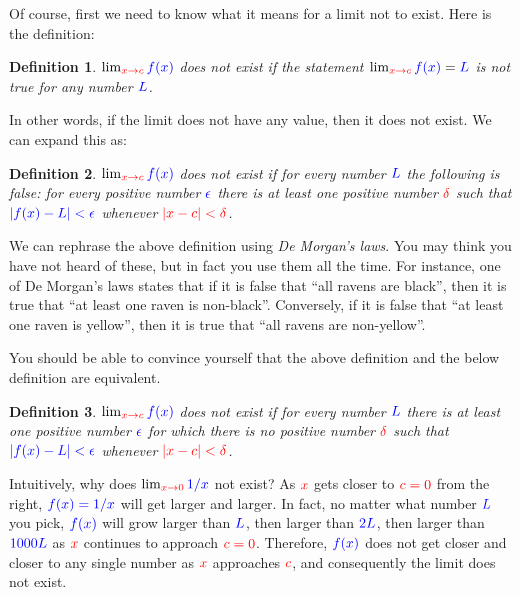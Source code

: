 \documentclass{myarticle}
\newcommand{\hor}[1]{\textcolor{red}{#1}}
\newcommand{\ver}[1]{\textcolor{blue}{#1}}
\theoremstyle{nospace}
\newtheorem*{oldattempt}{Definition}
\newenvironment{attempt}
{\begin{mdframed}\begin{oldattempt}}
    {\end{oldattempt}\end{mdframed}}
\newtheorem{old series theorem}{Theorem}
\newenvironment{series theorem}
{\begin{mdframed}\begin{old series theorem}}
    {\end{old series theorem}\end{mdframed}}
\begin{document}
Of course, first we need to know what it means for a limit not to
exist. Here is the definition:

\begin{attempt}
  $\lim_{\hor{x \to c}} \ver{f(x)}$ does not exist if the statement
  $\lim_{\hor{x \to c}} \ver{f(x)} = \ver{L}$ is not true for any
  number $\ver{L}$.
\end{attempt}

In other words, if the limit does not have any value, then it does not
exist. We can expand this as:

\begin{attempt}
  $\lim_{\hor{x \to c}} \ver{f(x)}$ does not exist if for every number
  $\ver{L}$ the following is false: for every positive number
  $\ver{\epsilon}$ there is at least one positive number
  $\hor{\delta}$ such that $\ver{|f(x) - L| < \epsilon}$ whenever
  $\hor{|x - c| < \delta}$.
\end{attempt}

We can rephrase the above definition using \emph{De Morgan's laws}.
You may think you have not heard of these, but in fact you use them
all the time. For instance, one of De Morgan's laws states that if it
is false that ``all ravens are black'', then it is true that ``at
least one raven is non-black''. Conversely, if it is false that ``at
least one raven is yellow'', then it is true that ``all ravens are
non-yellow''.

You should be able to convince yourself that the above definition and
the below definition are equivalent.

\begin{attempt}
  $\lim_{\hor{x \to c}} \ver{f(x)}$ does not exist if for every number
  $\ver{L}$ there is at least one positive number $\ver{\epsilon}$ for
  which there is \emph{no} positive number $\hor{\delta}$ such that
  $\ver{|f(x) - L| < \epsilon}$ whenever $\hor{|x - c| < \delta}$.
\end{attempt}

Intuitively, why does $\lim_{\hor{x \to 0}} \ver{1/x}$ not exist? As
$\hor{x}$ gets closer to $\hor{c = 0}$ from the right,
$\ver{f(x) = 1/x}$ will get larger and larger. In fact, no matter what
number $\ver{L}$ you pick, $\ver{f(x)}$ will grow larger than
$\ver{L}$, then larger than $\ver{2L}$, then larger than $\ver{1000L}$
as $\hor{x}$ continues to approach $\hor{c = 0}$. Therefore,
$\ver{f(x)}$ does not get closer and closer to any single number as
$\hor{x}$ approaches $\hor{c}$, and consequently the limit does not
exist.
\end{document}
